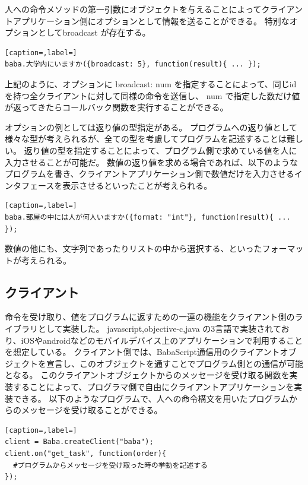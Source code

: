 \documentclass{deimj}
\begin{document}
人への命令メソッドの第一引数にオブジェクトを与えることによってクライアントアプリケーション側にオプションとして情報を送ることができる。
特別なオプションとしてbroadcast が存在する。

\begin{lstlisting}[caption=,label=]
baba.大学内にいますか({broadcast: 5}, function(result){ ... });
\end{lstlisting}

上記のように、オプションに broadcast: num を指定することによって、同じidを持つ全クライアントに対して同様の命令を送信し、 num で指定した数だけ値が返ってきたらコールバック関数を実行することができる。

オプションの例としては返り値の型指定がある。
プログラムへの返り値として様々な型が考えられるが、全ての型を考慮してプログラムを記述することは難しい。
返り値の型を指定することによって、プログラム側で求めている値を人に入力させることが可能だ。
数値の返り値を求める場合であれば、以下のようなプログラムを書き、クライアントアプリケーション側で数値だけを入力させるインタフェースを表示させるといったことが考えられる。

\begin{lstlisting}[caption=,label=]
baba.部屋の中には人が何人いますか({format: "int"}, function(result){ ... });
\end{lstlisting}
数値の他にも、文字列であったりリストの中から選択する、といったフォーマットが考えられる。

\subsection{クライアント}

命令を受け取り、値をプログラムに返すための一連の機能をクライアント側のライブラリとして実装した。
javascript,objective-c,java の3言語で実装されており、iOSやandroidなどのモバイルデバイス上のアプリケーションで利用することを想定している。
クライアント側では、BabaScript通信用のクライアントオブジェクトを宣言し、このオブジェクトを通すことでプログラム側との通信が可能となる。
このクライアントオブジェクトからのメッセージを受け取る関数を実装することによって、プログラマ側で自由にクライアントアプリケーションを実装できる。
以下のようなプログラムで、人への命令構文を用いたプログラムからのメッセージを受け取ることができる。

\begin{lstlisting}[caption=,label=]
client = Baba.createClient("baba");
client.on("get_task", function(order){
  #プログラムからメッセージを受け取った時の挙動を記述する
});
\end{lstlisting}
\end{document}
